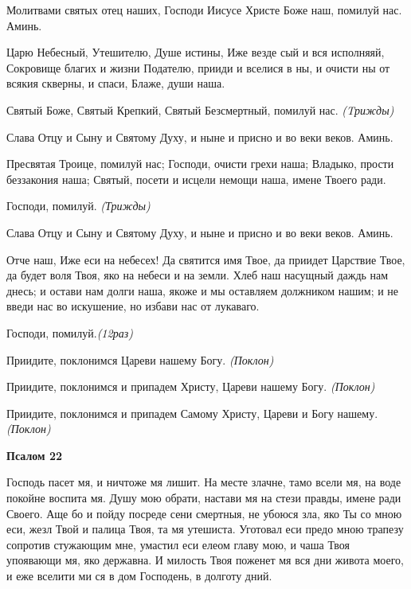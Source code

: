  


Молитвами святых отец наших, Господи Иисусе Христе Боже наш, помилуй нас. Аминь.


Царю Небесный, Утешителю, Душе истины, Иже везде сый и вся исполняяй, Сокровище благих и жизни Подателю, прииди и вселися в ны, и очисти ны от всякия скверны, и спаси, Блаже, души наша.


Святый Боже, Святый Крепкий, Святый Безсмертный, помилуй нас. \itshape (Tрижды)\normalfont{}


Слава Отцу и Сыну и Святому Духу, и ныне и присно и во веки веков. Аминь.


Пресвятая Троице, помилуй нас; Господи, очисти грехи наша; Владыко, прости беззакония наша; Святый, посети и исцели немощи наша, имене Твоего ради.


Господи, помилуй. \itshape (Трижды)\normalfont{}


Слава Отцу и Сыну и Святому Духу, и ныне и присно и во веки веков. Аминь.


Отче наш, Иже еси на небесех! Да святится имя Твое, да приидет Царствие Твое, да будет воля Твоя, яко на небеси и на земли. Хлеб наш насущный даждь нам днесь; и остави нам долги наша, якоже и мы оставляем должником нашим; и не введи нас во искушение, но избави нас от лукаваго.


Господи, помилуй.\itshape  (12раз)\normalfont{}


Приидите, поклонимся Цареви нашему Богу. \itshape (Поклон)\normalfont{}


Приидите, поклонимся и припадем Христу, Цареви нашему Богу. \itshape (Поклон)\normalfont{}


Приидите, поклонимся и припадем Самому Христу, Цареви и Богу нашему.\itshape (Поклон)\normalfont{}


\medskip
\bfseries Псалом 22\normalfont{}


Господь пасет мя, и ничтоже мя лишит. На месте злачне, тамо всели мя, на воде покойне воспита мя. Душу мою обрати, настави мя на стези правды, имене ради Своего. Аще бо и пойду посреде сени смертныя, не убоюся зла, яко Ты со мною еси, жезл Твой и палица Твоя, та мя утешиста. Уготовал еси предо мною трапезу сопротив стужающим мне, умастил еси елеом главу мою, и чаша Твоя упоявающи мя, яко державна. И милость Твоя поженет мя вся дни живота моего, и еже вселити ми ся в дом Господень, в долготу дний.


